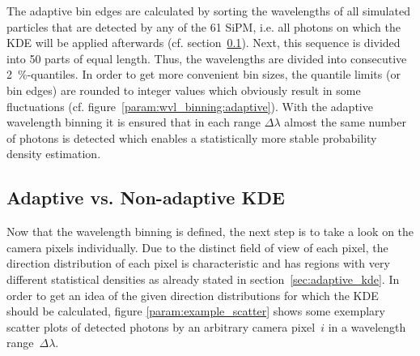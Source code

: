 The adaptive bin edges are calculated by sorting the wavelengths of all simulated particles that are detected by any of the 61 SiPM, i.e. all photons on which the KDE will be applied afterwards (cf. section~\ref{sec:adaptive_vs_nonadaptive}). Next, this sequence is divided into \num{50} parts of equal length. Thus, the wavelengths are divided into consecutive \SI{2}{\percent}-quantiles. In order to get more convenient bin sizes, the quantile limits (or bin edges) are rounded to integer values which obviously result in some fluctuations (cf. figure~\ref{param:wvl_binning:adaptive}).
With the adaptive wavelength binning it is ensured that in each range $\Delta\lambda$ almost the same number of photons is detected which enables a statistically more stable probability density estimation.

\subsection{Adaptive vs. Non-adaptive KDE}\label{sec:adaptive_vs_nonadaptive}

Now that the wavelength binning is defined, the next step is to take a look on the camera pixels individually. Due to the distinct field of view of each pixel, the direction distribution of each pixel is characteristic and has regions with very different statistical densities as already stated in section~\ref{sec:adaptive_kde}. In order to get an idea of the given direction distributions for which the KDE should be calculated, figure \ref{param:example_scatter} shows some exemplary scatter plots of detected photons by an arbitrary camera pixel~$i$ in a wavelength range~$\Delta\lambda$.

